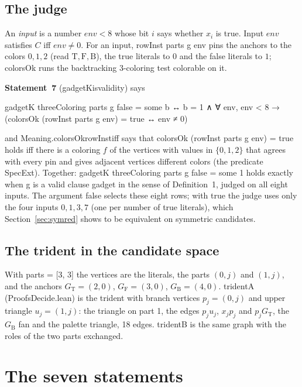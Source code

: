 \documentclass[11pt,a4paper]{article}
\newcommand{\leanus}{\textunderscore\allowbreak}
\newcommand{\lean}[1]{{\ttfamily\let\_\leanus #1}}
\newcommand{\GT}{G_{\mathrm{T}}}
\newcommand{\GF}{G_{\mathrm{F}}}
\newcommand{\GB}{G_{\mathrm{B}}}
\newcommand{\T}{\mathrm{T}}
\newcommand{\F}{\mathrm{F}}
\newcommand{\B}{\mathrm{B}}
\theoremstyle{definition}
\begin{document}
\subsection{The judge}\label{sec:judge}
An \emph{input} is a number $\mathit{env}<8$ whose bit $i$ says whether
$x_i$ is true. Input $\mathit{env}$ satisfies $C$ iff $\mathit{env}\neq 0$.
For an input, \lean{rowInst parts g env} pins the anchors to the colors
$0,1,2$ (read $\T,\F,\B$), the true literals to $0$ and the false literals to
$1$; \lean{colorsOk} runs the backtracking 3-coloring test \lean{colorable}
on it.

\textbf{Statement~7} (\lean{gadgetK\_is\_validity}) says
\begin{code}
gadgetK threeColoring parts g false = some b ↔
  b = 1 ∧ ∀ env, env < 8 → (colorsOk (rowInst parts g env) = true ↔ env ≠ 0)
\end{code}
and \lean{Meaning.colorsOk\_rowInst\_iff} says that
\lean{colorsOk (rowInst parts g env) = true} holds iff there is a coloring
$f$ of the vertices with values in $\{0,1,2\}$ that agrees with every pin and
gives adjacent vertices different colors (the predicate \lean{SpecExt}).
Together: \lean{gadgetK threeColoring parts g false = some 1} holds exactly
when \lean{g} is a valid clause gadget in the sense of Definition~1, judged
on all eight inputs. The argument \lean{false} selects these eight rows;
with \lean{true} the judge uses only the four inputs $0,1,3,7$ (one per
number of true literals), which Section~\ref{sec:symred} shows to be
equivalent on symmetric candidates.

\subsection{The trident in the candidate space}
With \lean{parts = [3, 3]} the vertices are the literals, the parts
$(0,j)$ and $(1,j)$, and the anchors $\GT=(2,0)$, $\GF=(3,0)$, $\GB=(4,0)$.
\lean{tridentA} (\lean{ProofsDecide.lean}) is the trident with branch
vertices $p_j=(0,j)$ and upper triangle $u_j=(1,j)$: the triangle on part 1,
the edges $p_j u_j$, $x_j p_j$ and $p_j\GT$, the $\GB$ fan and the palette
triangle, 18 edges. \lean{tridentB} is the same graph with the roles of the
two parts exchanged.

\section{The seven statements}\label{sec:statements}
\end{document}
